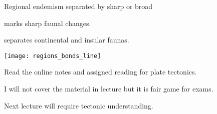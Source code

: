 \documentclass[t]{beamer}
\begin{document}
{
\begin{frame}[b,plain]{Regional endemism separated by sharp or broad }

\end{frame}
}



{
\begin{frame}[b,plain]{ marks sharp faunal changes.}

\end{frame}
}

\begin{frame}[b,plain]{ separates continental and insular faunas.}
	\begin{center}
		\texttt{[image: regions\_bonds\_line]}
	\end{center}
\end{frame}

{
\begin{frame}[b,plain]

\end{frame}
}

\begin{frame}[t,plain]

	\hangpara Read the online notes and assigned reading for plate tectonics.
	
	\hangpara I will not cover the material in lecture but it is fair game for exams.
	
	\hangpara Next lecture will require tectonic understanding.
	
\end{frame}
\end{document}
